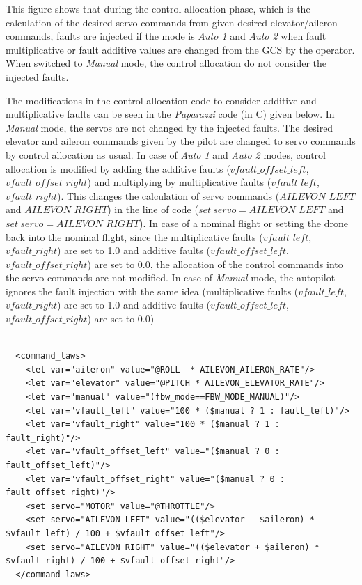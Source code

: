 This figure shows that during the control allocation phase, which is the calculation of the desired servo commands from given desired elevator/aileron commands, faults are injected if the mode is \emph{Auto 1} and \emph{Auto 2} when fault multiplicative or fault additive values are changed from the GCS by the operator.  When switched to \emph{Manual} mode, the control allocation do not consider the injected faults. 

The modifications in the control allocation code to consider additive and multiplicative faults can be seen in the \emph{Paparazzi} code (in C) given below. In \emph{Manual} mode, the servos are not changed by the injected faults. The desired elevator and aileron commands given by the pilot are changed to servo commands by control allocation as usual. In case of \emph{Auto 1} and \emph{Auto 2} modes, control allocation is modified by adding the additive faults ($vfault\_offset\_left$,$vfault\_offset\_right$) and multiplying by multiplicative faults ($vfault\_left$,\ $vfault\_right$). This changes the calculation of servo commands ($AILEVON\_{LEFT}$ and $AILEVON\_{RIGHT}$) in the line of code ($set \ servo = AILEVON\_{LEFT}$ and $set \ servo = AILEVON\_{RIGHT}$). In case of a nominal flight or setting the drone back into the nominal flight, since the multiplicative faults ($vfault\_left$,\ $vfault\_right$) are set to 1.0 and additive faults ($vfault\_offset\_left$,$vfault\_offset\_right$) are set to 0.0, the allocation of the control commands into the servo commands are not modified. In case of \emph{Manual} mode, the autopilot ignores the fault injection with the same idea (multiplicative faults ($vfault\_left$,\ $vfault\_right$) are set to 1.0 and additive faults ($vfault\_offset\_left$, \\ $vfault\_offset\_right$) are set to 0.0)


\lstset{language=C}
\begin{lstlisting}

  <command_laws>
    <let var="aileron" value="@ROLL  * AILEVON_AILERON_RATE"/>
    <let var="elevator" value="@PITCH * AILEVON_ELEVATOR_RATE"/>
    <let var="manual" value="(fbw_mode==FBW_MODE_MANUAL)"/>
    <let var="vfault_left" value="100 * ($manual ? 1 : fault_left)"/>
    <let var="vfault_right" value="100 * ($manual ? 1 : fault_right)"/>
    <let var="vfault_offset_left" value="($manual ? 0 : fault_offset_left)"/>
    <let var="vfault_offset_right" value="($manual ? 0 : fault_offset_right)"/>
    <set servo="MOTOR" value="@THROTTLE"/>
    <set servo="AILEVON_LEFT" value="(($elevator - $aileron) * $vfault_left) / 100 + $vfault_offset_left"/>
    <set servo="AILEVON_RIGHT" value="(($elevator + $aileron) * $vfault_right) / 100 + $vfault_offset_right"/>
  </command_laws>
  
\end{lstlisting}


